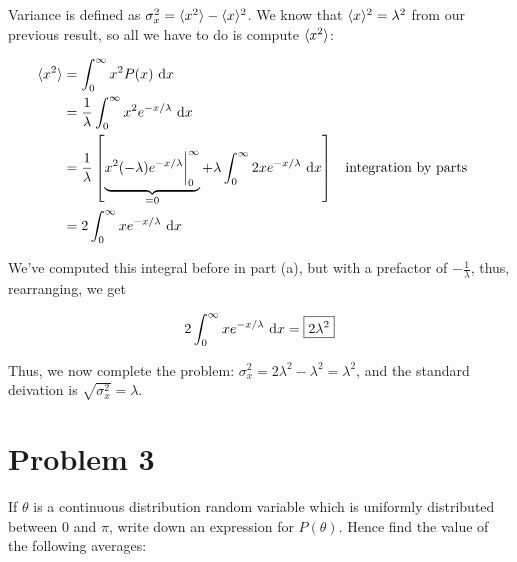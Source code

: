\documentclass{article}
\begin{document}
\begin{enumerate}[label = (\alph*)]
    \begin{solution}
        Variance is defined as $\sigma_x^2 = \langle x^2 \rangle - \langle x \rangle^2$. We know that $\langle x \rangle^2 = \lambda^2$ from our previous result, so all we have to do is compute $\langle x^2 \rangle$:

        \begin{align*}
            \langle x^2 \rangle &= \int_0^\infty x^2P(x) \ \mathrm d x\\
            &= \frac{1}{\lambda} \int_0^\infty x^2e^{-x/\lambda} \ \mathrm d x \\
            &= \frac{1}{\lambda}\left[\underbrace{x^2(-\lambda)e^{-x/\lambda}\bigg|_0^\infty}_{= 0} + \lambda \int_0^\infty 2xe^{-x/\lambda} \ \mathrm d x\right] && \text{integration by parts}\\
            &= 2\int_0^\infty xe^{-x/\lambda} \ \mathrm d x
        \end{align*} 

        We've computed this integral before in part (a), but with a prefactor of $-\frac{1}{\lambda}$, thus, rearranging, we get

        \[ 2\int_0^\infty xe^{-x/\lambda} \ \mathrm d x = \boxed{2\lambda^2}\]


        Thus, we now complete the problem: $\sigma_x^2 = 2\lambda^2 - \lambda^2 = \lambda^2$, and the standard deivation is $\sqrt{\sigma_x^2} = \lambda$.
    \end{solution}
\end{enumerate}

\pagebreak
\section*{Problem 3}

If $\theta$ is a continuous distribution random variable which is uniformly distributed between 0 and $\pi$, write down an expression for $P(\theta)$. Hence find the value of the following averages:
\end{document}
